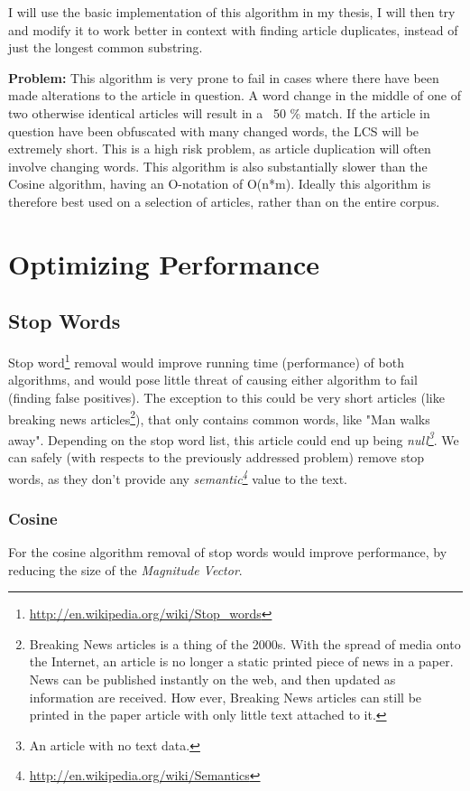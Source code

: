 I will use the basic implementation of this algorithm in my thesis, I will then try and modify it to work better in context with finding article duplicates, instead of just the longest common substring.

\textbf{Problem:} This algorithm is very prone to fail in cases where there have been made alterations to the article in question. A word change in the middle of one of two otherwise identical articles will result in a ~50 \% match. If the article in question have been obfuscated with many changed words, the LCS will be extremely short. This is a high risk problem, as article duplication will often involve changing words. This algorithm is also substantially slower than the Cosine algorithm, having an O-notation of O(n*m). Ideally this algorithm is therefore best used on a selection of articles, rather than on the entire corpus.


\section{Optimizing Performance}
\subsection{Stop Words}
Stop word\footnote{\url{http://en.wikipedia.org/wiki/Stop_words}} removal would improve running time (performance) of both algorithms, and would pose little threat of causing either algorithm to fail (finding false positives). The exception to this could be very short articles (like breaking news articles\footnote{Breaking News articles is a thing of the 2000s. With the spread of media onto the Internet, an article is no longer a static printed piece of news in a paper. News can be published instantly on the web, and then updated as information are received. How ever, Breaking News articles can still be printed in the paper article with only little text attached to it.}), that only contains common words, like "Man walks away". Depending on the stop word list, this article could end up being \textit{null\footnote{An article with no text data.}}.
We can safely (with respects to the previously addressed problem) remove stop words, as they don't provide any \textit{semantic\footnote{\url{http://en.wikipedia.org/wiki/Semantics}}} value to the text.

\subsubsection{Cosine}
For the cosine algorithm removal of stop words would improve performance, by reducing the size of the \textit{Magnitude Vector}. 


